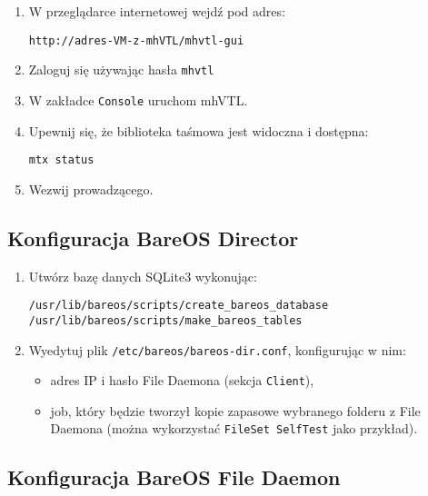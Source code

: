 \documentclass[polish]{article}
\begin{document}
\begin{enumerate}

\item W przeglądarce internetowej wejdź pod adres:
\begin{verbatim}
http://adres-VM-z-mhVTL/mhvtl-gui
\end{verbatim}

\item Zaloguj się używając hasła \texttt{mhvtl}

\item W zakładce \texttt{Console} uruchom mhVTL.

\item Upewnij się, że biblioteka taśmowa jest widoczna i dostępna:
\begin{verbatim}
mtx status
\end{verbatim}

\item Wezwij prowadzącego.

\end{enumerate}


\subsection*{Konfiguracja BareOS Director}

\begin{enumerate}

\item Utwórz bazę danych SQLite3 wykonując:
\begin{verbatim}
/usr/lib/bareos/scripts/create_bareos_database
/usr/lib/bareos/scripts/make_bareos_tables
\end{verbatim}

\item Wyedytuj plik \texttt{/etc/bareos/bareos-dir.conf}, konfigurując w nim:
\begin{itemize}
\item adres IP i hasło File Daemona (sekcja \texttt{Client}),
\item job, który będzie tworzył kopie zapasowe wybranego folderu z File Daemona (można wykorzystać \texttt{FileSet SelfTest} jako przykład).
\end{itemize}

\end{enumerate}


\subsection*{Konfiguracja BareOS File Daemon}
\end{document}

